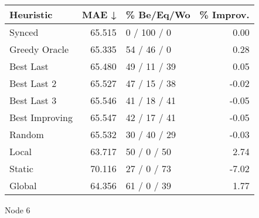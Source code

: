 \begin{tabular}{lrlr}
\toprule
\textbf{Heuristic} & \textbf{MAE ↓} & \textbf{\% Be/Eq/Wo} & \textbf{\% Improv.} \\
\midrule
            Synced &         65.515 &          0 / 100 / 0 &                0.00 \\
     Greedy Oracle &         65.335 &          54 / 46 / 0 &                0.28 \\
         Best Last &         65.480 &         49 / 11 / 39 &                0.05 \\
       Best Last 2 &         65.527 &         47 / 15 / 38 &               -0.02 \\
       Best Last 3 &         65.546 &         41 / 18 / 41 &               -0.05 \\
    Best Improving &         65.547 &         42 / 17 / 41 &               -0.05 \\
            Random &         65.532 &         30 / 40 / 29 &               -0.03 \\
             Local &         63.717 &          50 / 0 / 50 &                2.74 \\
            Static &         70.116 &          27 / 0 / 73 &               -7.02 \\
            Global &         64.356 &          61 / 0 / 39 &                1.77 \\
\bottomrule
\end{tabular}
\caption{Node 6}
\label{tab:iid_lr01_le1_bs4_6}
